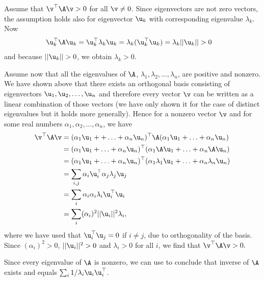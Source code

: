 \begin{exenumerate}
  \begin{solution}

    Assume that $\v^\top \A\v > 0$ for all $\v \neq 0$. Since eigenvectors are not
    zero vectors, the assumption holds also for eigenvector $\u_k$ with
    corresponding eigenvalue $\lambda_k$. Now
    \begin{align}
      \u_k^\top \A\u_k &= \u_k^\top\lambda_k\u_k = \lambda_k(\u_k^\top\u_k) = \lambda_k||\u_k|| > 0
    \end{align}
    and because $||\u_k|| > 0$, we obtain $\lambda_k > 0$.

    Assume now that all the eigenvalues of $\A$, $\lambda_1, \lambda_2, \ldots, \lambda_n$, are positive and nonzero. We have shown above that there exists an orthogonal basis consisting of eigenvectors $\u_1, \u_2, \ldots, \u_n$ and therefore every vector $\v$ can be written as a
    linear combination of those vectors (we have only shown it for the case of distinct eigenvalues but it holds more generally). Hence for a nonzero vector $\v$ and for some real numbers $\alpha_1, \alpha_2, \ldots, \alpha_n$, we have
    \begin{align}
      \v^\top\A\v &= (\alpha_1\u_1 + + \ldots + \alpha_n\u_n)^\top \A(\alpha_1\u_1 + \ldots + \alpha_n\u_n) \\
                  &= (\alpha_1\u_1 + \ldots + \alpha_n\u_n)^\top(\alpha_1\A\u_1 + \ldots + \alpha_n\A\u_n) \\
                  &= (\alpha_1\u_1 + \ldots + \alpha_n\u_n)^\top(\alpha_1\lambda_1\u_1 + \ldots + \alpha_n\lambda_n\u_n) \\
                  &= \sum_{i,j} \alpha_i\u_i^\top\alpha_j\lambda_j\u_j \\
                  &= \sum_i \alpha_i\alpha_i\lambda_i\u_i^\top\u_i \\
                  &= \sum_i (\alpha_i)^2||\u_i||^2\lambda_i,
    \end{align}
    where we have used that $\u_i^\top\u_j = 0$ if $i \neq j$, due to orthogonality of the basis. Since $(\alpha_i)^2 > 0$, $||\u_i||^2 > 0$ and $\lambda_i > 0$ for all $i$, we find that $\v^\top\A\v > 0.$

    Since every eigenvalue of $\A$ is nonzero, we can use  to conclude that inverse of $\A$ exists and equals $\sum_i 1/\lambda_i \u_i \u_i^\top$.

  \end{solution}

\end{exenumerate}


